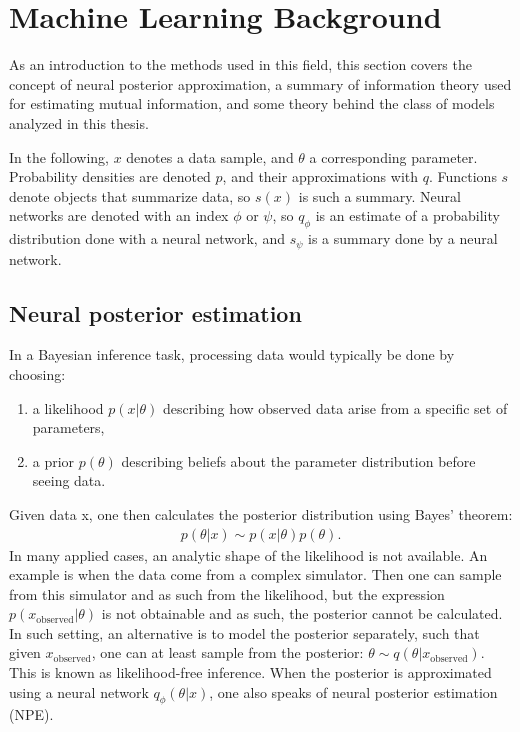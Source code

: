 \section{Machine Learning Background}

As an introduction to the methods used in this field, this section covers the concept of neural posterior approximation, a summary of information theory used for estimating mutual information, and some theory behind the class of models analyzed in this thesis.

In the following, $x$ denotes a data sample, and $\theta$ a corresponding parameter. Probability densities are denoted $p$, and their approximations with $q$. Functions $s$ denote objects that summarize data, so $s(x)$ is such a summary. Neural networks are denoted with an index $\phi$ or $\psi$, so $q_\phi$ is an estimate of a probability distribution done with a neural network, and $s_\psi$ is a summary done by a neural network.

\subsection{Neural posterior estimation}
In a Bayesian inference task, processing data would typically be done by choosing:
\begin{enumerate}
    \item   a likelihood $p(x|\theta)$ describing how observed data arise from a specific set of parameters,
    \item   a prior $p(\theta)$ describing beliefs about the parameter distribution before seeing data.
\end{enumerate}
Given data x, one then calculates the posterior distribution using Bayes' theorem:
\begin{align}
    p(\theta|x) \sim p(x|\theta) p(\theta).
\end{align}
In many applied cases, an analytic shape of the likelihood is not available. An example is when the data come from a complex simulator. Then one can sample from this simulator and as such from the likelihood, but the expression $p(x_{\text{observed}}|\theta)$ is not obtainable and as such, the posterior cannot be calculated. In such setting, an alternative is to model the posterior separately, such that given $x_{\text{observed}}$, one can at least sample from the posterior: $\theta \sim q(\theta | x_{\text{observed}})$. This is known as likelihood-free inference. When the posterior is approximated using a neural network $q_\phi(\theta |x)$, one also speaks of neural posterior estimation (NPE).

